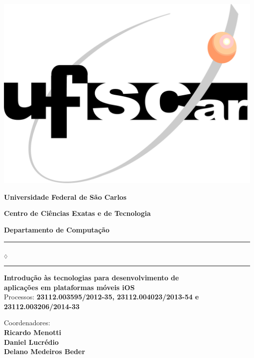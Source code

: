 
\begin{center}

\begin{minipage}[c]{\textwidth}
  \parbox[c]{3cm}{
      \begin{flushright}
      \includegraphics[width=.25\textwidth]{../figuras/LogoUfscar}
      \end{flushright}
  }
  \parbox[c]{12cm}
    {
      \begin{center}
      \textbf{\Large Universidade Federal de São Carlos}

      \vspace{0.07cm}

      \textbf{\large Centro de Ciências Exatas e de Tecnologia}

      \vspace{0.07cm}

      \textbf{\large Departamento de Computação}
      \vspace{0.07cm}
      \end{center}
    }
\end{minipage}

\vspace{-0.5cm}
\rule{7.5cm}{0.03pc}{\tiny $_\diamondsuit$}\rule{7.5cm}{0.03pc}

\vspace*{20ex}

\textbf{\Large {Introdução às tecnologias para desenvolvimento de \\ aplicações em plataformas móveis iOS}} \\
\large{ Processos: \textbf{23112.003595/2012-35, 23112.004023/2013-54 e 23112.003206/2014-33}}

\vspace*{5ex}

{\Large{ Coordenadores:  }} \\
\textbf{\Large{ Ricardo Menotti}} \\
\textbf{\Large{ Daniel Lucrédio}} \\
\textbf{\Large{ Delano Medeiros Beder}}

\vspace*{5ex}


\end{center}
